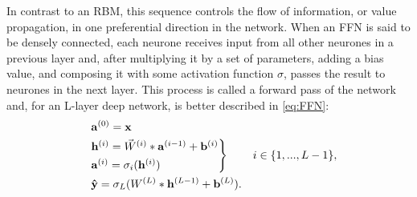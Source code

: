 In contrast to an RBM, this sequence controls the flow of information, or value propagation, in one preferential direction in the network. When an FFN is said to be densely connected, each neurone receives input from all other neurones in a previous layer and, after multiplying it by a set of parameters, adding a bias value, and composing it with some activation function $\sigma$, passes the result to neurones in the next layer. This process is called a forward pass of the network and, for an L-layer deep network, is better described in \eqref{eq:FFN}:
\begin{align}
&            && \mathbf{a}^{(0)} = \mathbf{x} \notag\\
&            && 
                \negthickspace%
                \begin{rcases}  
                \mathbf{h}^{(i)}= \Vec{W}^{(i)} * \mathbf{a}^{(i-1)} + \mathbf{b}^{(i)} \notag\\
                \mathbf{a}^{(i)}    = \sigma_i(\mathbf{h}^{(i)}) 
                    \end{rcases}&  i \in \{1, ..., L-1\}, \\
&            &&\mathbf{\hat{y}} = \sigma_L(W^{(L)} *\mathbf{h}^{(L-1)} + \mathbf{b}^{(L)}).
\label{eq:FFN}
\end{align}

